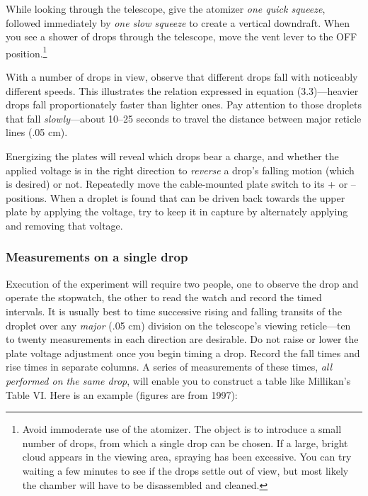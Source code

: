 While looking through the telescope, give the atomizer \emph{one quick
squeeze}, followed im\-me\-di\-ate\-ly by \emph{one slow squeeze} to create a
vertical downdraft. When you see a shower of drops through the
telescope, move the vent lever to the OFF po\-si\-tion.\footnote{Avoid
  immoderate use of the atomizer. The object is to introduce a small
  number of drops, from which a single drop can be chosen. If a large,
  bright cloud appears in the viewing area, spraying has been excessive.
  You can try waiting a few minutes to see if the drops settle out of
  view, but most likely the chamber will have to be disassembled and
  cleaned.}

With a number of drops in view, observe that different drops fall with
noticeably different speeds. This illustrates the relation expressed in
equation (3.3)---heavier drops fall proportionately faster than lighter
ones. Pay attention to those droplets that fall \emph{slowly}---about
10--25 seconds to travel the distance between major reticle lines (.05
cm).

Energizing the plates will reveal which drops bear a charge, and whether
the applied voltage is in the right direction to \emph{reverse} a drop's
falling motion (which is desired) or not. Repeatedly move the
cable-mounted plate switch to its + or -- positions. When a droplet is
found that can be driven back towards the upper plate by applying the
voltage, try to keep it in capture by alternately applying and removing
that voltage.

\subsubsection*{Measurements on a single drop}

Execution of the experiment will require two people, one to observe the
drop and operate the stopwatch, the other to read the watch and record
the timed intervals. It is usually best to time successive rising and
falling transits of the droplet over any \emph{major} (.05 cm) division
on the telescope's viewing reticle---ten to twenty measurements in each
direction are desirable. Do not raise or lower the plate voltage
adjustment once you begin timing a drop. Record the fall times and rise
times in separate columns. A series of measurements of these times,
\emph{all performed on the same drop}, will enable you to construct a
table like Millikan's Table VI. Here is an example (figures are from
1997):

